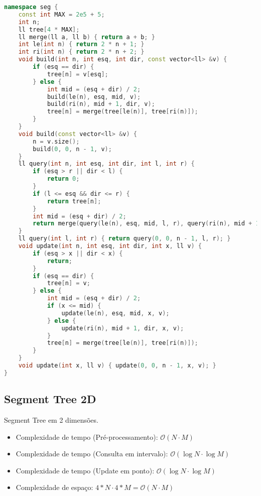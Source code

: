 \documentclass[10pt, a4paper, oneside]{book}
\begin{document}
\begin{lstlisting}[language=C++]
namespace seg {
    const int MAX = 2e5 + 5;
    int n;
    ll tree[4 * MAX];
    ll merge(ll a, ll b) { return a + b; }
    int le(int n) { return 2 * n + 1; }
    int ri(int n) { return 2 * n + 2; }
    void build(int n, int esq, int dir, const vector<ll> &v) {
        if (esq == dir) {
            tree[n] = v[esq];
        } else {
            int mid = (esq + dir) / 2;
            build(le(n), esq, mid, v);
            build(ri(n), mid + 1, dir, v);
            tree[n] = merge(tree[le(n)], tree[ri(n)]);
        }
    }
    void build(const vector<ll> &v) {
        n = v.size();
        build(0, 0, n - 1, v);
    }
    ll query(int n, int esq, int dir, int l, int r) {
        if (esq > r || dir < l) {
            return 0;
        }
        if (l <= esq && dir <= r) {
            return tree[n];
        }
        int mid = (esq + dir) / 2;
        return merge(query(le(n), esq, mid, l, r), query(ri(n), mid + 1, dir, l, r));
    }
    ll query(int l, int r) { return query(0, 0, n - 1, l, r); }
    void update(int n, int esq, int dir, int x, ll v) {
        if (esq > x || dir < x) {
            return;
        }
        if (esq == dir) {
            tree[n] = v;
        } else {
            int mid = (esq + dir) / 2;
            if (x <= mid) {
                update(le(n), esq, mid, x, v);
            } else {
                update(ri(n), mid + 1, dir, x, v);
            }
            tree[n] = merge(tree[le(n)], tree[ri(n)]);
        }
    }
    void update(int x, ll v) { update(0, 0, n - 1, x, v); }
}
\end{lstlisting}
\hfill

\subsection{Segment Tree 2D}


Segment Tree em 2 dimensões.



\begin{itemize}
\item Complexidade de tempo (Pré-processamento): $\mathcal{O}(N \cdot M)$
\item Complexidade de tempo (Consulta em intervalo): $\mathcal{O}(\log N \cdot \log M)$
\item Complexidade de tempo (Update em ponto): $\mathcal{O}(\log N \cdot \log M)$
\item Complexidade de espaço: $4 * N \cdot 4 * M = \mathcal{O}(N \cdot M)$
\end{itemize}
\end{document}

